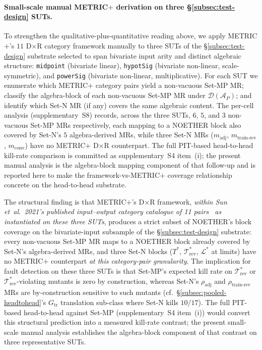 \documentclass[manuscript]{acmart}
\begin{document}
\paragraph{Small-scale manual METRIC$+$ derivation on three \S\ref{subsec:test-design} SUTs.}
\label{para:metricplus-headtohead-small}
To strengthen the qualitative-plus-quantitative reading above, we apply
METRIC$+$'s $11$ D$\times$R category framework manually to three SUTs of
the \S\ref{subsec:test-design} substrate selected to span bivariate
input arity and distinct algebraic structure: \texttt{midpoint}
(bivariate linear), \texttt{hypotSig} (bivariate non-linear, scale-symmetric),
and \texttt{powerSig} (bivariate non-linear, multiplicative). For each
SUT we enumerate which METRIC$+$ category pairs yield a non-vacuous
Set-MP MR; classify the algebra-block of each non-vacuous Set-MP MR
under $\mathcal{D}(\mathcal{A}_P)$; and identify which Set-N MR (if any)
covers the same algebraic content. The per-cell analysis (supplementary~S8) records, across the three SUTs, $6$, $5$, and $3$ non-vacuous Set-MP MRs respectively, each mapping to a NOETHER block also covered by Set-N's $5$ algebra-derived MRs, while three Set-N MRs ($m_{\mathrm{adj}}$, $m_{\mathrm{train\text{-}rev}}$, $m_{\mathrm{conv}}$) have no METRIC$+$ D$\times$R counterpart. The full PIT-based head-to-head kill-rate
comparison is committed as supplementary~S4 item~(i); the
present manual analysis is the algebra-block mapping component of
that follow-up and is reported here to make the framework-vs-METRIC$+$
coverage relationship concrete on the head-to-head substrate.


The structural finding is
that METRIC$+$'s D$\times$R framework, \emph{within Sun et~al.\ 2021's
published input--output category catalogue of 11 pairs~\cite{SunMETRICplus2021}
as instantiated on these three SUTs}, produces a strict subset of NOETHER's
block coverage on the bivariate-input subsample of the \S\ref{subsec:test-design}
substrate: every non-vacuous Set-MP MR maps to a NOETHER block already
covered by Set-N's algebra-derived MRs, and three Set-N blocks
($T^{*}$, $\mathcal{T}^{*}_{\mathrm{rev}}$, $\mathcal{L}^{*}$ at limits)
have no METRIC$+$ counterpart \emph{at this category-pair granularity}. The implication for fault detection on
these three SUTs is that Set-MP's expected kill rate on $\mathcal{T}^{*}_{\mathrm{rev}}$
or $\mathcal{T}^{*}_{\mathrm{rev}}$-violating mutants is zero by
construction, whereas Set-N's $\rho_{\mathrm{adj}}$ and
$\rho_{\mathrm{train\text{-}rev}}$ MRs are by-construction sensitive
to such mutants (cf.\ \S\ref{subsec:pooled-headtohead}'s
$G_{\mathrm{tr}}$ translation sub-class where Set-N kills $10/17$). The full PIT-based
head-to-head against Set-MP (supplementary~S4 item~(i))
would convert this structural prediction into a measured kill-rate
contrast; the present small-scale manual analysis establishes the
algebra-block component of that contrast on three representative SUTs.
\end{document}
